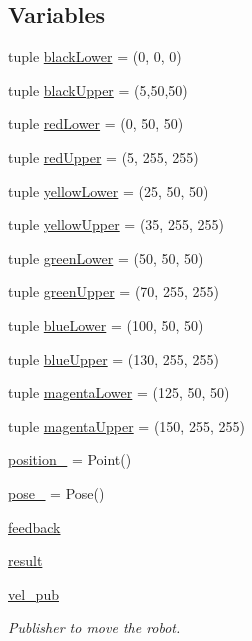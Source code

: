 \subsection*{Variables}
\begin{DoxyCompactItemize}
\item 
tuple \hyperlink{namespacetrack_a4ee13246ec46c21cfdcfee1b16f7eec4}{black\+Lower} = (0, 0, 0)
\item 
tuple \hyperlink{namespacetrack_a7c7120c727a2836315550f0091cd7277}{black\+Upper} = (5,50,50)
\item 
tuple \hyperlink{namespacetrack_a760fae991a015aa4ee4c08fcaadeb576}{red\+Lower} = (0, 50, 50)
\item 
tuple \hyperlink{namespacetrack_a1549403b0cb47b249afba9cdeca7ec16}{red\+Upper} = (5, 255, 255)
\item 
tuple \hyperlink{namespacetrack_a29d421bd8aa932d14a9cbf7779bba62b}{yellow\+Lower} = (25, 50, 50)
\item 
tuple \hyperlink{namespacetrack_a2071c6a41ecce68b84c956b0c5f8219a}{yellow\+Upper} = (35, 255, 255)
\item 
tuple \hyperlink{namespacetrack_ae3b9cb19e6647fa48bae473c1b3152ea}{green\+Lower} = (50, 50, 50)
\item 
tuple \hyperlink{namespacetrack_a2a45da69392a010f85aa42de064d7c85}{green\+Upper} = (70, 255, 255)
\item 
tuple \hyperlink{namespacetrack_a222fd73291da99272b344d9089ce0fde}{blue\+Lower} = (100, 50, 50)
\item 
tuple \hyperlink{namespacetrack_ae6e375645538a7968d81c8ebe9ee5b7d}{blue\+Upper} = (130, 255, 255)
\item 
tuple \hyperlink{namespacetrack_a4778acbcac36117d4384a64aff1283bd}{magenta\+Lower} = (125, 50, 50)
\item 
tuple \hyperlink{namespacetrack_a159d6ddb51827712e530f1f1e59369c7}{magenta\+Upper} = (150, 255, 255)
\item 
\hyperlink{namespacetrack_a7299b48bcf1df87418078ead7079339d}{position\+\_\+} = Point()
\item 
\hyperlink{namespacetrack_a4fcc239004d2df0fe5a4ea23c9b0495f}{pose\+\_\+} = Pose()
\item 
\hyperlink{namespacetrack_a99bdf85519e387c8c0c7612a0b46dc56}{feedback}
\item 
\hyperlink{namespacetrack_a029891d5b553b75642e169dde1d3fa2f}{result}
\item 
\hyperlink{namespacetrack_a2f8cfd339cb658bb3d8f142eef1dbaeb}{vel\+\_\+pub}
\begin{DoxyCompactList}\small\item\em Publisher to move the robot. \end{DoxyCompactList}\item 

\end{DoxyCompactItemize}

